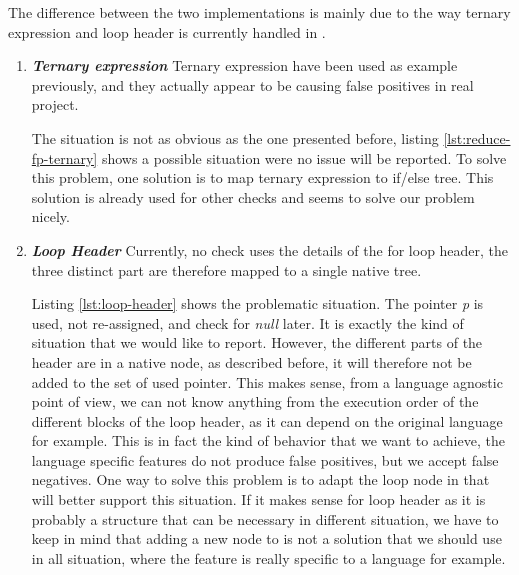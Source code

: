 The difference between the two implementations is mainly due to the way ternary expression and loop header is currently handled in \slang.
\begin{enumerate}
	\item \textbf{\textit{Ternary expression}} \newline 
	\label{subsubsec:reducing_false_positive_ternary}
	Ternary expression have been used as example previously, and they actually appear to be causing false positives in real project.
	
	
	
	The situation is not as obvious as the one presented before, listing \ref{lst:reduce-fp-ternary} shows a possible situation were no issue will be reported. 
	To solve this problem, one solution is to map ternary expression to if/else tree.
	This solution is already used for other checks and seems to solve our problem nicely.
	
	\item \textbf{\textit{Loop Header}} \newline 	
	\label{subsubsec:loop_header}
	Currently, no check uses the details of the for loop header, the three distinct part are therefore mapped to a single native tree. 
	
	
	
	Listing \ref{lst:loop-header} shows the problematic situation. 
	The pointer \emph{p} is used, not re-assigned, and check for \emph{null} later. 
	It is exactly the kind of situation that we would like to report. 
	However, the different parts of the header are in a native node, as described before, it will therefore not be added to the set of used pointer.
	This makes sense, from a language agnostic point of view, we can not know anything from the execution order of the different blocks of the loop header, as it can depend on the original language for example. 
	This is in fact the kind of behavior that we want to achieve, the language specific features do not produce false positives, but we accept false negatives.
	One way to solve this problem is to adapt the loop node in \slang{} that will better support this situation.
	If it makes sense for loop header as it is probably a structure that can be necessary in different situation, we have to keep in mind that adding a new node to \slang{} is not a solution that we should use in all situation, where the feature is really specific to a language for example.
\end{enumerate}

